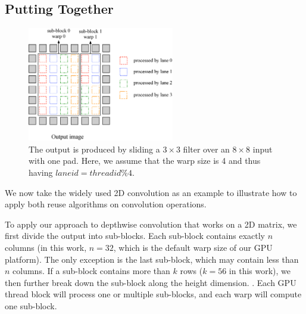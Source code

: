 \subsection{Putting Together}
\label{sec:together}
\begin{figure}
	\centering
	\includegraphics[width=0.8\columnwidth,height=5cm]{./figure/overalldesign.eps} 
	\vspace{-3mm}
	\caption{The output is produced by sliding a $3 \times
3$ filter over an $8 \times 8$ input with one pad. Here, we assume
that the warp size is 4 and thus having $laneid=threadid\%4$.} \label{fig:overalldesign}
\end{figure}


We now take the widely used 2D convolution as an example to illustrate how to apply both reuse algorithms
on convolution operations.


To apply our approach to depthwise convolution that works on a 2D matrix, we first divide the output into sub-blocks. Each sub-block
contains exactly $n$ columns (in this work, $n = 32$, which is the default warp size of our GPU platform). The only exception is the last
sub-block, which may contain less than $n$ columns. If a sub-block contains more than $k$ rows ($k=56$ in this work), we then further
break down the sub-block along the height dimension. . Each GPU thread block will process one or multiple sub-blocks, and each warp will
compute one sub-block.


